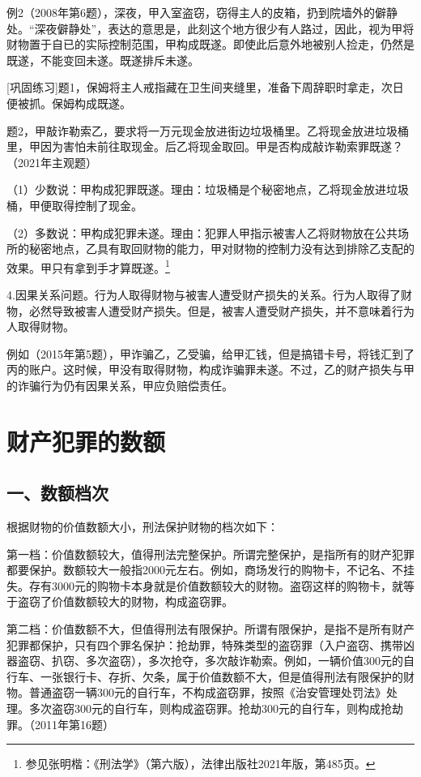 例2（2008年第6题），深夜，甲入室盗窃，窃得主人的皮箱，扔到院墙外的僻静处。“深夜僻静处”，表达的意思是，此刻这个地方很少有人路过，因此，视为甲将财物置于自已的实际控制范围，甲构成既遂。即使此后意外地被别人捡走，仍然是既遂，不能变回未遂。既遂排斥未遂。

[巩固练习]题1，保姆将主人戒指藏在卫生间夹缝里，准备下周辞职时拿走，次日便被抓。保姆构成既遂。

题2，甲敲诈勒索乙，要求将一万元现金放进街边垃圾桶里。乙将现金放进垃圾桶里，甲因为害怕未前往取现金。后乙将现金取回。甲是否构成敲诈勒索罪既遂？（2021年主观题）

（1）少数说：甲构成犯罪既遂。理由：垃圾桶是个秘密地点，乙将现金放进垃圾桶，甲便取得控制了现金。

（2）多数说：甲构成犯罪未遂。理由：犯罪人甲指示被害人乙将财物放在公共场所的秘密地点，乙具有取回财物的能力，甲对财物的控制力没有达到排除乙支配的效果。甲只有拿到手才算既遂。\footnote{参见张明楷：《刑法学》（第六版），法律出版社2021年版，第485页。}

4.因果关系问题。行为人取得财物与被害人遭受财产损失的关系。行为人取得了财物，必然导致被害人遭受财产损失。但是，被害人遭受财产损失，并不意味着行为人取得财物。

例如（2015年第5题），甲诈骗乙，乙受骗，给甲汇钱，但是搞错卡号，将钱汇到了丙的账户。这时候，甲没有取得财物，构成诈骗罪未遂。不过，乙的财产损失与甲的诈骗行为仍有因果关系，甲应负赔偿责任。

\section{财产犯罪的数额}

\subsection*{一、数额档次}

根据财物的价值数额大小，刑法保护财物的档次如下：

第一档：价值数额较大，值得刑法完整保护。所谓完整保护，是指所有的财产犯罪都要保护。数额较大一般指2000元左右。例如，商场发行的购物卡，不记名、不挂失。存有3000元的购物卡本身就是价值数额较大的财物。盗窃这样的购物卡，就等于盗窃了价值数额较大的财物，构成盗窃罪。

第二档：价值数额不大，但值得刑法有限保护。所谓有限保护，是指不是所有财产犯罪都保护，只有四个罪名保护：抢劫罪，特殊类型的盗窃罪（入户盗窃、携带凶器盗窃、扒窃、多次盗窃），多次抢夺，多次敲诈勒索。例如，一辆价值300元的自行车、一张银行卡、存折、欠条，属于价值数额不大，但是值得刑法有限保护的财物。普通盗窃一辆300元的自行车，不构成盗窃罪，按照《治安管理处罚法》处理。多次盗窃300元的自行车，则构成盗窃罪。抢劫300元的自行车，则构成抢劫罪。（2011年第16题）

